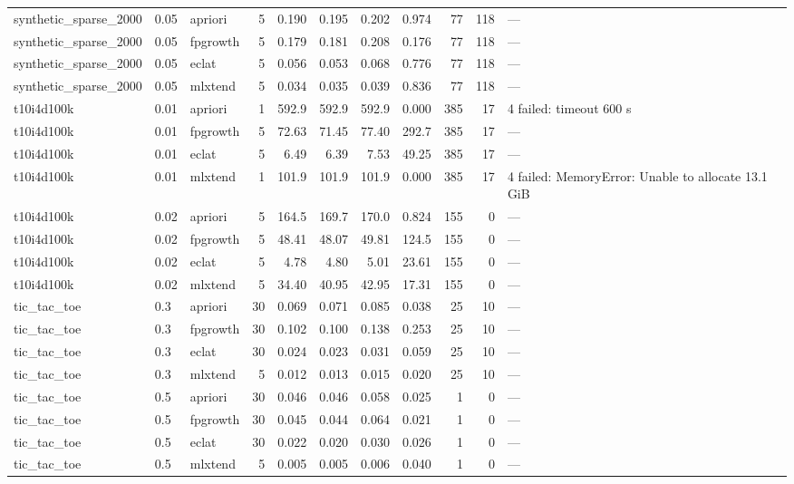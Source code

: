 \documentclass[twocolumn,10pt]{article}
\begin{document}
\begin{longtable}{p{3.0cm}llrrrrrrrp{2.4cm}}
synthetic\_\allowbreak{}sparse\_\allowbreak{}2000 & 0.05 & apriori & 5 & 0.190 & 0.195 & 0.202 & 0.974 & 77 & 118 & --- \\
synthetic\_\allowbreak{}sparse\_\allowbreak{}2000 & 0.05 & fpgrowth & 5 & 0.179 & 0.181 & 0.208 & 0.176 & 77 & 118 & --- \\
synthetic\_\allowbreak{}sparse\_\allowbreak{}2000 & 0.05 & eclat & 5 & 0.056 & 0.053 & 0.068 & 0.776 & 77 & 118 & --- \\
synthetic\_\allowbreak{}sparse\_\allowbreak{}2000 & 0.05 & mlxtend & 5 & 0.034 & 0.035 & 0.039 & 0.836 & 77 & 118 & --- \\
t10i4d100k & 0.01 & apriori & 1 & 592.9 & 592.9 & 592.9 & 0.000 & 385 & 17 & 4 failed: timeout 600 s \\
t10i4d100k & 0.01 & fpgrowth & 5 & 72.63 & 71.45 & 77.40 & 292.7 & 385 & 17 & --- \\
t10i4d100k & 0.01 & eclat & 5 & 6.49 & 6.39 & 7.53 & 49.25 & 385 & 17 & --- \\
t10i4d100k & 0.01 & mlxtend & 1 & 101.9 & 101.9 & 101.9 & 0.000 & 385 & 17 & 4 failed: MemoryError: Unable to allocate 13.1 GiB \\
t10i4d100k & 0.02 & apriori & 5 & 164.5 & 169.7 & 170.0 & 0.824 & 155 & 0 & --- \\
t10i4d100k & 0.02 & fpgrowth & 5 & 48.41 & 48.07 & 49.81 & 124.5 & 155 & 0 & --- \\
t10i4d100k & 0.02 & eclat & 5 & 4.78 & 4.80 & 5.01 & 23.61 & 155 & 0 & --- \\
t10i4d100k & 0.02 & mlxtend & 5 & 34.40 & 40.95 & 42.95 & 17.31 & 155 & 0 & --- \\
tic\_\allowbreak{}tac\_\allowbreak{}toe & 0.3 & apriori & 30 & 0.069 & 0.071 & 0.085 & 0.038 & 25 & 10 & --- \\
tic\_\allowbreak{}tac\_\allowbreak{}toe & 0.3 & fpgrowth & 30 & 0.102 & 0.100 & 0.138 & 0.253 & 25 & 10 & --- \\
tic\_\allowbreak{}tac\_\allowbreak{}toe & 0.3 & eclat & 30 & 0.024 & 0.023 & 0.031 & 0.059 & 25 & 10 & --- \\
tic\_\allowbreak{}tac\_\allowbreak{}toe & 0.3 & mlxtend & 5 & 0.012 & 0.013 & 0.015 & 0.020 & 25 & 10 & --- \\
tic\_\allowbreak{}tac\_\allowbreak{}toe & 0.5 & apriori & 30 & 0.046 & 0.046 & 0.058 & 0.025 & 1 & 0 & --- \\
tic\_\allowbreak{}tac\_\allowbreak{}toe & 0.5 & fpgrowth & 30 & 0.045 & 0.044 & 0.064 & 0.021 & 1 & 0 & --- \\
tic\_\allowbreak{}tac\_\allowbreak{}toe & 0.5 & eclat & 30 & 0.022 & 0.020 & 0.030 & 0.026 & 1 & 0 & --- \\
tic\_\allowbreak{}tac\_\allowbreak{}toe & 0.5 & mlxtend & 5 & 0.005 & 0.005 & 0.006 & 0.040 & 1 & 0 & --- \\
\end{longtable}
\end{document}
